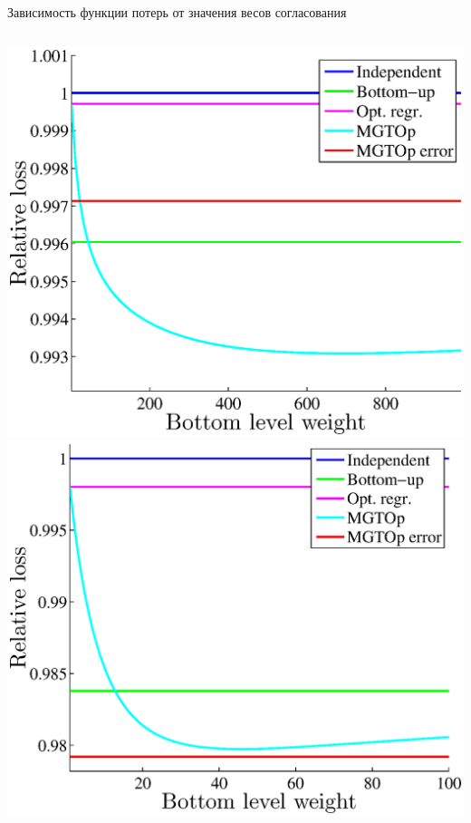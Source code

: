 \documentclass{beamer}
\begin{document}
\begin{frame}{\small Зависимость функции потерь от значения весов согласования}
    \begin{columns}[c]
			\includegraphics[width=\textwidth]{ReconciliationAllMethodsRailRoads.eps}\\ 
			\includegraphics[width=\textwidth]{ReconciliationAllMethodsEnergy.eps}\\ 
    \end{columns}
\end{frame}
\end{document}

